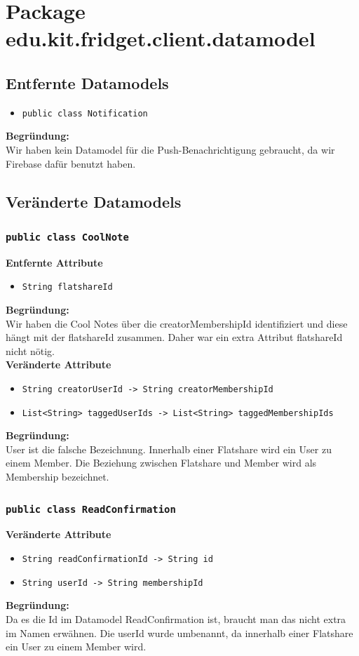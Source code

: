 \documentclass[a4paper]{scrreprt}
\begin{document}
	
	\newpage 
	
		\section{Package edu.kit.fridget.client.datamodel}
	\subsection{Entfernte Datamodels}
	\begin{itemize}
		\item \texttt{public class Notification}
	\end{itemize}
	\textbf{Begründung:}\\
	Wir haben kein Datamodel für die Push-Benachrichtigung gebraucht, da wir Firebase dafür benutzt haben.
	\subsection{Veränderte Datamodels}
	\subsubsection{\texttt{public class CoolNote}}
	\textbf{Entfernte Attribute}
	\begin{itemize}
		\item \texttt{String flatshareId}
	\end{itemize}
	\textbf{Begründung:}\\
	Wir haben die Cool Notes über die creatorMembershipId identifiziert und diese hängt mit der flatshareId zusammen. Daher war ein extra Attribut flatshareId nicht nötig.\\
	\textbf{Veränderte Attribute}
	\begin{itemize}
		\item \texttt{String creatorUserId -> String creatorMembershipId}
		\item \texttt{List<String> taggedUserIds -> List<String> taggedMembershipIds}
	\end{itemize}
	\textbf{Begründung:}\\
	User ist die falsche Bezeichnung. Innerhalb einer Flatshare wird ein User zu einem Member. Die Beziehung zwischen Flatshare und Member wird als Membership bezeichnet.
	\subsubsection{\texttt{public class ReadConfirmation}}
	\textbf{Veränderte Attribute}
	\begin{itemize}
		\item \texttt{String readConfirmationId -> String id}
		\item \texttt{String userId -> String membershipId}
	\end{itemize}
	\textbf{Begründung:}\\
	Da es die Id im Datamodel ReadConfirmation ist, braucht man das nicht extra im Namen erwähnen. Die userId wurde umbenannt, da innerhalb einer Flatshare ein User zu einem Member wird.
\end{document}
